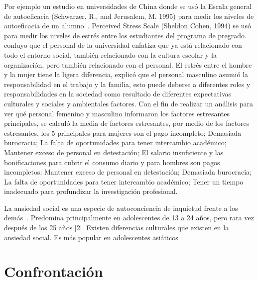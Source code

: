 \documentclass[jou,apacite]{apa6}
\begin{document}
Por ejemplo un estudio en universidades de China donde se usó la Escala general de autoeficacia (Schwarzer, R., and Jerusalem, M. 1995) para medir los niveles de autoeficacia de un alumno~\cite{Schwarzer}. Perceived Stress Scale (Sheldon Cohen, 1994) se usó para medir los niveles de estrés entre los estudiantes del programa de pregrado. conluyo que el personal de la universidad enfatiza que ya está relacionado con todo el entorno social, también relacionado con la cultura escolar y la organización, pero también relacionado con el personal. El estrés entre el hombre y la mujer tiene la ligera diferencia, explicó que el personal masculino asumió la responsabilidad en el trabajo y la familia, esto puede deberse a diferentes roles y responsabilidades en la sociedad como resultado de diferentes expectativas culturales y sociales y ambientales factores. Con el fin de realizar un análisis para ver qué personal femenino y masculino informaron los factores estresantes principales, se calculó la media de factores estresantes, por medio de los factores estresantes, los 5 principales para mujeres son el pago incompleto; Demasiada burocracia; La falta de oportunidades para tener intercambio académico; Mantener exceso de personal en detestación; El salario insuficiente y las bonificaciones para cubrir el consumo diario y para hombres son pagos incompletos; Mantener exceso de personal en detestación; Demasiada burocracia; La falta de oportunidades para tener intercambio académico; Tener un tiempo inadecuado para profundizar la investigación profesional.~\cite{Liu}

La ansiedad social es una especie de autoconciencia de inquietud frente a los demás~\cite{Fenistein}. Predomina principalmente en adolescentes de 13 a 24 años, pero rara vez después de los 25 años [2]. Existen diferencias culturales que existen en la ansiedad social. Es más popular en adolescentes asiáticos ~\cite{Kan}

\section{Confrontación}
\end{document}
